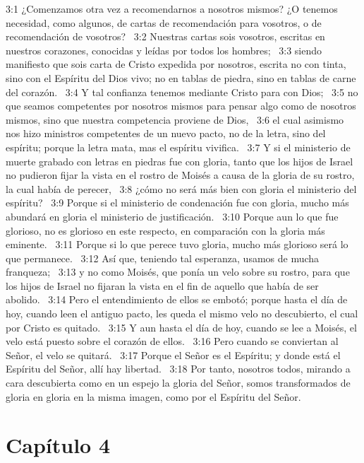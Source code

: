 3:1 ¿Comenzamos otra vez a recomendarnos a nosotros mismos? ¿O tenemos necesidad, como algunos, de cartas de recomendación para vosotros, o de recomendación de vosotros?  
3:2 Nuestras cartas sois vosotros, escritas en nuestros corazones, conocidas y leídas por todos los hombres;  
3:3 siendo manifiesto que sois carta de Cristo expedida por nosotros, escrita no con tinta, sino con el Espíritu del Dios vivo; no en tablas de piedra, sino en tablas de carne del corazón.  
3:4 Y tal confianza tenemos mediante Cristo para con Dios;  
3:5 no que seamos competentes por nosotros mismos para pensar algo como de nosotros mismos, sino que nuestra competencia proviene de Dios,  
3:6 el cual asimismo nos hizo ministros competentes de un nuevo pacto, no de la letra, sino del espíritu; porque la letra mata, mas el espíritu vivifica.  
3:7 Y si el ministerio de muerte grabado con letras en piedras fue con gloria, tanto que los hijos de Israel no pudieron fijar la vista en el rostro de Moisés a causa de la gloria de su rostro, la cual había de perecer,  
3:8 ¿cómo no será más bien con gloria el ministerio del espíritu?  
3:9 Porque si el ministerio de condenación fue con gloria, mucho más abundará en gloria el ministerio de justificación.  
3:10 Porque aun lo que fue glorioso, no es glorioso en este respecto, en comparación con la gloria más eminente.  
3:11 Porque si lo que perece tuvo gloria, mucho más glorioso será lo que permanece.  
3:12 Así que, teniendo tal esperanza, usamos de mucha franqueza;  
3:13 y no como Moisés, que ponía un velo sobre su rostro, para que los hijos de Israel no fijaran la vista en el fin de aquello que había de ser abolido.  
3:14 Pero el entendimiento de ellos se embotó; porque hasta el día de hoy, cuando leen el antiguo pacto, les queda el mismo velo no descubierto, el cual por Cristo es quitado.  
3:15 Y aun hasta el día de hoy, cuando se lee a Moisés, el velo está puesto sobre el corazón de ellos.  
3:16 Pero cuando se conviertan al Señor, el velo se quitará.  
3:17 Porque el Señor es el Espíritu; y donde está el Espíritu del Señor, allí hay libertad.  
3:18 Por tanto, nosotros todos, mirando a cara descubierta como en un espejo la gloria del Señor, somos transformados de gloria en gloria en la misma imagen, como por el Espíritu del Señor.  
\section*{Capítulo 4} 


